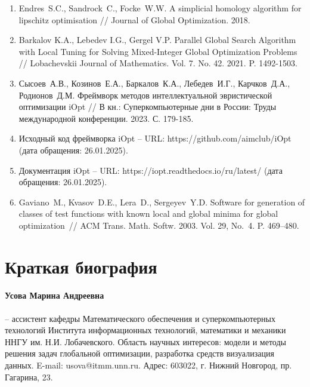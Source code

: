\documentclass[a4paper,12pt,russian]{article}
\begin{document}
\begin{enumerate}
\item \label{rfa:rulit:shgo}
Endres~S.C., Sandrock~C., Focke~W.W. A simplicial homology algorithm for lipschitz optimisation // Journal of Global Optimization. 2018.

\item \label{rfa:rulit:Barkalov2021}
Barkalov K.A., Lebedev I.G., Gergel V.P. Parallel Global Search Algorithm with Local Tuning for Solving Mixed-Integer Global Optimization Problems // Lobachevskii Journal of Mathematics. Vol. 7. No. 42. 2021. P. 1492-1503.

\item \label{rfa:rulit:iOptPaper}
Сысоев~А.В., Козинов~Е.А., Баркалов~К.А., Лебедев~И.Г., Карчков~Д.А., Родионов~Д.М. Фреймворк методов интеллектуальной эвристической оптимизации iOpt // В кн.: Суперкомпьютерные дни в России: Труды международной конференции. 2023. С. 179-185.

\item \label{rfa:rulit:iOptGithub}
Исходный код фреймворка iOpt -- URL: https://github.com/aimclub/iOpt (дата обращения: 26.01.2025).

\item \label{rfa:rulit:iOptDocs}
Документация iOpt -- URL: https://iopt.readthedocs.io/ru/latest/ (дата обращения: 26.01.2025).

\item \label{rfa:rulit:Gaviano2003}
Gaviano~M., Kvasov~D.E., Lera~D., Sergeyev~Y.D. Software for generation of classes of test functions with known local and global minima for global optimization~// ACM Trans. Math. Softw. 2003. Vol. 29, No.~4. P. 469--480.

\end{enumerate}

\section*{Краткая биография}
\paragraph{Усова Марина Андреевна} -- ассистент кафедры Математического обеспечения и суперкомпьютерных технологий Института информационных технологий, математики и механики ННГУ им. Н.И. Лобачевского. Область научных интересов: модели и методы решения задач глобальной оптимизации, разработка средств визуализация данных. E-mail: usova@itmm.unn.ru. Адрес: 603022, г. Нижний Новгород, пр. Гагарина, 23.
\end{document}
